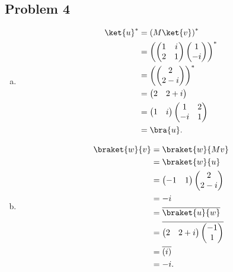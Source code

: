 \documentclass[10pt]{mypackage}
\begin{document}
\subsection{Problem 4}%
\begin{enumerate}[(a)]
  \item 
    \begin{align*}
      \ket{u}^{\ast} &= \left({M}\ket{v}\right)^{\ast}\\
                     &= \left( \begin{pmatrix}1 & i \\ 2 & 1\end{pmatrix} \begin{pmatrix}1\\-i\end{pmatrix}\right)^{\ast}\\
                     &= \left( \begin{pmatrix}2\\2-i\end{pmatrix}\right)^{\ast}\\
                     &= \begin{pmatrix}2 & 2+i\end{pmatrix}\\
                     &= \begin{pmatrix}1 & i\end{pmatrix} \begin{pmatrix}1 & 2 \\ -i & 1\end{pmatrix}\\
                     &= \bra{u}.
    \end{align*}
  \item 
    \begin{align*}
      \braket{w}{v} &= \braket{w}{{M}v}\\
                    &= \braket{w}{u}\\
                    &= \begin{pmatrix}-1 & 1\end{pmatrix} \begin{pmatrix}2\\2-i\end{pmatrix}\\
                    &= -i\\
                    &= \overline{\braket{u}{w}}\\
                    &= \overline{ \begin{pmatrix}2 & 2+i\end{pmatrix} \begin{pmatrix}-1\\1\end{pmatrix} }\\
                    &= \overline{\left(i\right)}\\
                    &= -i.
    \end{align*}
\end{enumerate}
\end{document}

